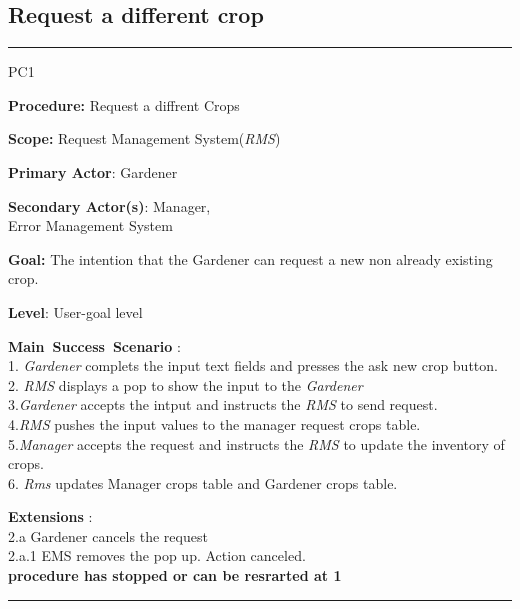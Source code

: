 \subsection{Request a different crop}
\vspace{0.5cm}
\hrule
\hfill
\begin{lyxlist}{PC1}
\small{
\item [\textbf{Procedure:}] Request a diffrent Crops
\item [\textbf{Scope:}] Request Management System(\emph{RMS})
\item [\textbf{Primary Actor}:] Gardener
\item [\textbf{Secondary Actor(s)}:] Manager,\\
Error Management System
\item [\textbf{Goal:}] The intention that the Gardener can request a new
non already existing crop.
\item [\textbf{Level}:] User-goal level
\item [\textbf{Main~Success~Scenario}]:\\
1. \emph{Gardener} complets the input text fields and presses the ask new crop
button.\\
2. \emph{RMS} displays a pop to show the input to the \emph{Gardener}\\
3.\emph{Gardener} accepts the intput and instructs the \emph{RMS} to send
request.\\
4.\emph{RMS} pushes the input values to the manager request crops table.\\
5.\emph{Manager} accepts the request and instructs the \emph{RMS} to update the
inventory of crops.\\
6. \emph{Rms} updates Manager crops table and Gardener crops table.\\
\item [\textbf{Extensions}]:\\
2.a Gardener cancels the request\\
\hspace*{0.5cm} 2.a.1 {EMS} removes the pop up. Action canceled.\\
\hspace*{0.5cm} \textbf{procedure has stopped or can be resrarted at 1}
}
\end{lyxlist}
\hrule
\vspace{0.5cm}


\break


